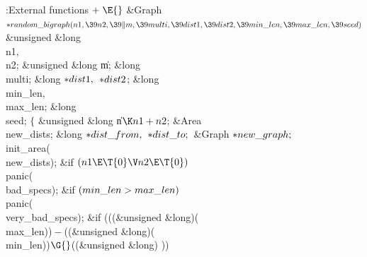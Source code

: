 \Y\B\4:External functions\X${}\mathrel+\E{}$\6
\1\1\&{Graph} ${}{*}\\{random\_bigraph}(\\{n1},\39\\{n2},\39\|m,\39\\{multi},%
\39\\{dist1},\39\\{dist2},\39\\{min\_len},\39\\{max\_len},\39\\{seed}){}$\6
\&{unsigned} \&{long} \\{n1}${},{}$ \\{n2};\6
\&{unsigned} \&{long} \|m;\6
\&{long} \\{multi};\6
\&{long} ${}{*}\\{dist1},{}$ ${}{*}\\{dist2}{}$;\6
\&{long} \\{min\_len}${},{}$ \\{max\_len};\6
\&{long} \\{seed};\2\2\6
${}\{{}$\5
\1\&{unsigned} \&{long} \|n${}\K\\{n1}+\\{n2}{}$;%
\6
\&{Area} \\{new\_dists};\6
\&{long} ${}{*}\\{dist\_from},{}$ ${}{*}\\{dist\_to};{}$\6
\&{Graph} ${}{*}\\{new\_graph};{}$\7
\\{init\_area}(\\{new\_dists});\6
\&{if} ${}(\\{n1}\E\T{0}\V\\{n2}\E\T{0}){}$\1\5
\\{panic}(\\{bad\_specs});\2\6
\&{if} ${}(\\{min\_len}>\\{max\_len}){}$\1\5
\\{panic}(\\{very\_bad\_specs});\2\6
\&{if} (((\&{unsigned} \&{long})(\\{max\_len}))${}-{}$((\&{unsigned} \&{long})(%
\\{min\_len}))${}\G{}$((\&{unsigned} \&{long}) ))\1\5
